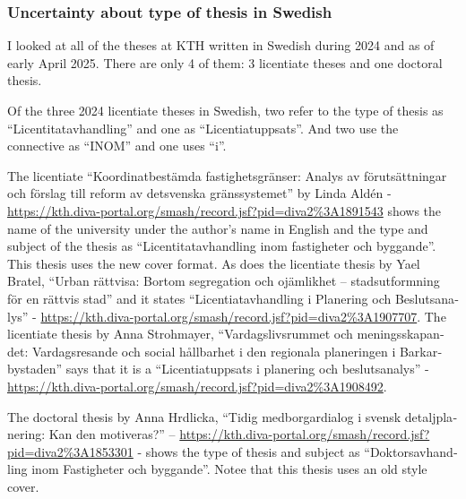 \documentclass[12pt, twoside]{article}
\begin{document}
\subsubsection{Uncertainty about type of thesis in Swedish}
\label{sec:cycleSwedishLicentiateThesisType}

I looked at all of the theses at KTH written in Swedish during 2024 and as of early April 2025. There are only 4 of them: 3 licentiate theses and one doctoral thesis.

Of the three 2024 licentiate theses in Swedish, two refer to the type of thesis as \enquote{\foreignlanguage{swedish}{Licentitatavhandling}} and one as \enquote{\foreignlanguage{swedish}{Licentiatuppsats}}. And two use the connective as \enquote{\foreignlanguage{swedish}{INOM}} and one uses \enquote{\foreignlanguage{swedish}{i}}.

The licentiate \enquote{\foreignlanguage{swedish}{Koordinatbestämda fastighetsgränser: Analys av förutsättningar och förslag till reform av detsvenska gränssystemet}} by Linda Aldén - \url{https://kth.diva-portal.org/smash/record.jsf?pid=diva2%3A1891543} shows the name of the university under the author's name in English and the type and subject of the thesis  as \enquote{\foreignlanguage{swedish}{Licentitatavhandling inom fastigheter och byggande}}. This thesis uses the new cover format.
As does the licentiate thesis by Yael Bratel, \enquote{\foreignlanguage{swedish}{Urban rättvisa: Bortom segregation och ojämlikhet – stadsutformning för en rättvis stad}} and it states \enquote{\foreignlanguage{swedish}{Licentiatavhandling i Planering och Beslutsanalys}} - \url{https://kth.diva-portal.org/smash/record.jsf?pid=diva2%3A1907707}.
The licentiate thesis by Anna Strohmayer, \enquote{\foreignlanguage{swedish}{Vardagslivsrummet och meningsskapandet: Vardagsresande och social hållbarhet i den regionala planeringen i Barkarbystaden}} says that it is a \enquote{\foreignlanguage{swedish}{Licentiatuppsats i planering och beslutsanalys}} - \url{https://kth.diva-portal.org/smash/record.jsf?pid=diva2%3A1908492}. 

The doctoral thesis by Anna Hrdlicka, \enquote{\foreignlanguage{swedish}{Tidig medborgardialog i svensk detaljplanering: Kan den motiveras?}} 
-- \url{https://kth.diva-portal.org/smash/record.jsf?pid=diva2%3A1853301} - shows the type of thesis and subject as \enquote{\foreignlanguage{swedish}{Doktorsavhandling inom Fastigheter och byggande}}. Notee that this thesis uses an old style cover.
\end{document}
